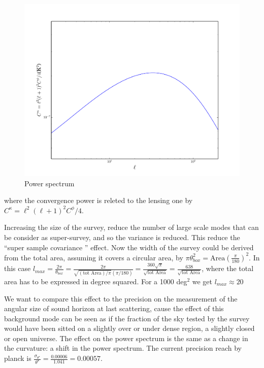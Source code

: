 \documentclass[prd,onecolumn,amsmath,amssymb,floatfix,superscriptaddress,notitlepage]{revtex4-1}
\begin{document}
\begin{figure}[htbp]
\begin{center}
\includegraphics[scale=0.4]{./images/Ckappa.pdf}
\caption{Power spectrum}
\end{center}
\end{figure}

where the convergence power is releted to the lensing one by $C^{\kappa}=\ell^{2}(\ell+1)^{2}C^{\phi}/4$.

Increasing the size of the survey, reduce the number of large scale modes that can be consider as super-survey, and so the variance is reduced. This reduce the ``super sample covariance '' effect. 
Now the width of the survey could be derived from the total area, assuming it covers a circular area, by $\pi \theta_{box}^{2}=\text{Area}(\frac{\pi}{180})^{2}$. 
In this case $l_{max}=\frac{2\pi}{\theta_{box}}=\frac{2\pi}{\sqrt{(\text{tot Area})/\pi} (\pi/180)}=\frac{360\sqrt\pi}{\sqrt{\text{tot Area}}}=\frac{638}{\sqrt{\text{tot Area}}}$, where the total area has to be expressed in degree squared. For a 1000 deg$^{2}$ we get $l_{max}\approx20$

We want to compare this effect to the precision on the measurement of the angular size of sound horizon at last scattering, cause the effect of this background mode can be seen as if the fraction of the sky tested by the survey would have been sitted on a slightly over or under dense region, a slightly closed or open universe. The effect on the power spectrum is the same as a change in the curvature: a shift in the power spectrum.
The current precision reach by planck is $\frac{\sigma_{\theta^{\star}}}{\theta^{\star}}=\frac{0.00006}{1.041}=0.00057$.
\end{document}

